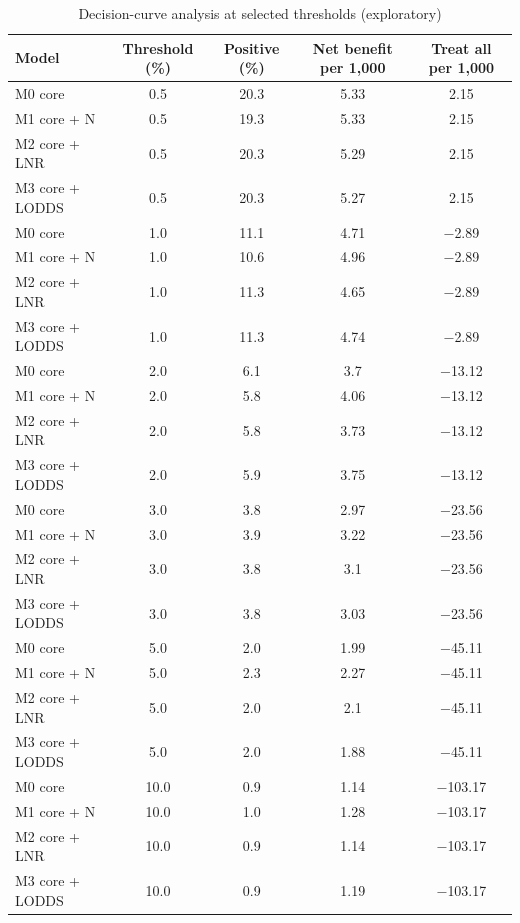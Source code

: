 \begin{table}[htbp]
\caption{Decision-curve analysis at selected thresholds (exploratory)}\label{tab:s18_dca}
\scriptsize
\begin{tabular*}{\textwidth}{@{\extracolsep{\fill}}lcccc@{}}
\toprule
Model & Threshold (\%) & Positive (\%) & Net benefit per 1,000 & Treat all per 1,000 \\
\midrule
M0 core & 0.5 & 20.3 & 5.33 & 2.15 \\
M1 core + N & 0.5 & 19.3 & 5.33 & 2.15 \\
M2 core + LNR & 0.5 & 20.3 & 5.29 & 2.15 \\
M3 core + LODDS & 0.5 & 20.3 & 5.27 & 2.15 \\
M0 core & 1.0 & 11.1 & 4.71 & $-$2.89 \\
M1 core + N & 1.0 & 10.6 & 4.96 & $-$2.89 \\
M2 core + LNR & 1.0 & 11.3 & 4.65 & $-$2.89 \\
M3 core + LODDS & 1.0 & 11.3 & 4.74 & $-$2.89 \\
M0 core & 2.0 & 6.1 & 3.7 & $-$13.12 \\
M1 core + N & 2.0 & 5.8 & 4.06 & $-$13.12 \\
M2 core + LNR & 2.0 & 5.8 & 3.73 & $-$13.12 \\
M3 core + LODDS & 2.0 & 5.9 & 3.75 & $-$13.12 \\
M0 core & 3.0 & 3.8 & 2.97 & $-$23.56 \\
M1 core + N & 3.0 & 3.9 & 3.22 & $-$23.56 \\
M2 core + LNR & 3.0 & 3.8 & 3.1 & $-$23.56 \\
M3 core + LODDS & 3.0 & 3.8 & 3.03 & $-$23.56 \\
M0 core & 5.0 & 2.0 & 1.99 & $-$45.11 \\
M1 core + N & 5.0 & 2.3 & 2.27 & $-$45.11 \\
M2 core + LNR & 5.0 & 2.0 & 2.1 & $-$45.11 \\
M3 core + LODDS & 5.0 & 2.0 & 1.88 & $-$45.11 \\
M0 core & 10.0 & 0.9 & 1.14 & $-$103.17 \\
M1 core + N & 10.0 & 1.0 & 1.28 & $-$103.17 \\
M2 core + LNR & 10.0 & 0.9 & 1.14 & $-$103.17 \\
M3 core + LODDS & 10.0 & 0.9 & 1.19 & $-$103.17 \\
\bottomrule
\end{tabular*}
\smallskip{}
\end{table}
